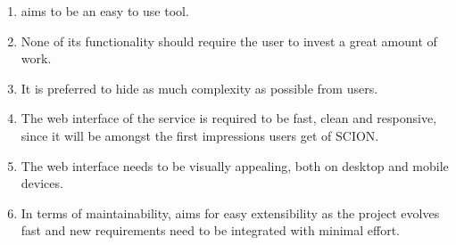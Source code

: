 \begin{enumerate}
	\item \lcs aims to be an easy to use tool.
	\item None of its functionality should require the user to invest a great amount of work.
	\item It is preferred to hide as much complexity as possible from users.
	\item The web interface of the service is required to be fast, clean and responsive, since it will be amongst the first impressions users get of SCION.
	\item The web interface needs to be visually appealing, both on desktop and mobile devices.
	\item In terms of maintainability, \lcs aims for easy extensibility as the project evolves fast and new requirements need to be integrated with minimal effort.
\end{enumerate}